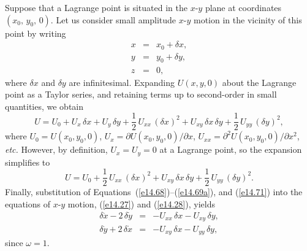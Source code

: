 Suppose that a Lagrange point is situated in the $x$-$y$ plane at coordinates $(x_0,\,y_0,\,0)$.
Let us consider small amplitude $x$-$y$ motion in the vicinity of this point by writing
\begin{eqnarray}\label{e14.68}
x&=& x_0 + \delta x,\\[0.5ex]
y&=&y_0 + \delta y,\label{e14.69}\\[0.5ex]
z &=&0,\label{e14.69a}
\end{eqnarray}
where $\delta x$ and $\delta y$ are infinitesimal. Expanding $U(x,y,0)$ about the Lagrange point as a Taylor series, and retaining terms up to second-order in small
quantities,  we obtain
\begin{equation}
U = U_0 + U_x\,\delta x+ U_y\,\delta y + \frac{1}{2}\,U_{xx}\,(\delta x)^2+ U_{xy}\,\delta x\,\delta y
+ \frac{1}{2}\,U_{yy}\,(\delta y)^2,
\end{equation}
where $U_0=U(x_0,y_0,0)$, $U_x=\partial U(x_0,y_0,0)/\partial x$, $U_{xx}=\partial^2 U(x_0,y_0,0)/\partial x^2$, 
{\em etc.} However, by definition, $U_x=U_y=0$ at a Lagrange point, so the expansion simplifies to
\begin{equation}\label{e14.71}
U = U_0 + \frac{1}{2}\,U_{xx}\,(\delta x)^2+ U_{xy}\,\delta x\,\delta y
+ \frac{1}{2}\,U_{yy}\,(\delta y)^2.
\end{equation}
Finally, substitution of Equations~(\ref{e14.68})--(\ref{e14.69a}), and (\ref{e14.71})
into the equations of $x$-$y$ motion, (\ref{e14.27}) and (\ref{e14.28}), yields
\begin{eqnarray}
\delta\ddot{x} - 2\,\delta\dot{y} &=& - U_{xx}\,\delta x -U_{xy}\,\delta y,\\[0.5ex]
\delta\ddot{y} + 2\,\delta\dot{x} &=& - U_{xy}\,\delta x -U_{yy}\,\delta y,
\end{eqnarray}
since $\omega = 1$. 

